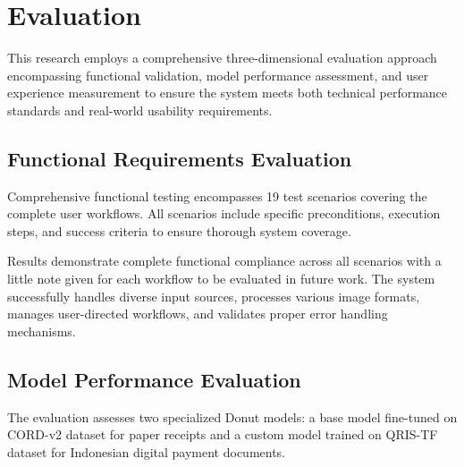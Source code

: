 \section{Evaluation}

This research employs a comprehensive three-dimensional evaluation approach encompassing functional validation, model performance assessment, and user experience measurement to ensure the system meets both technical performance standards and real-world usability requirements.

\subsection{Functional Requirements Evaluation}
Comprehensive functional testing encompasses 19 test scenarios covering the complete user workflows. All scenarios include specific preconditions, execution steps, and success criteria to ensure thorough system coverage. 

Results demonstrate complete functional compliance across all scenarios with a little note given for each workflow to be evaluated in future work. The system successfully handles diverse input sources, processes various image formats, manages user-directed workflows, and validates proper error handling mechanisms.




\subsection{Model Performance Evaluation}
The evaluation assesses two specialized Donut models: a base model fine-tuned on CORD-v2 dataset for paper receipts and a custom model trained on QRIS-TF dataset for Indonesian digital payment documents.

